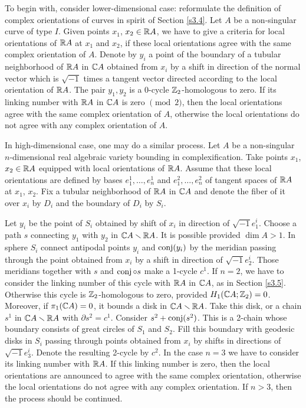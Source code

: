 \documentclass{article}
\numberwithin{equation}{section}
\begin{document}
To begin with, consider lower-dimensional case: reformulate the
definition of complex orientations of curves in spirit of Section
\ref{s3.4}.
Let $A$ be a non-singular curve of type $I$. Given points $x_1$,
$x_2\in\mathbb R A$, we have to give a criteria for local orientations of $\mathbb R
A$ at $x_1$ and $x_2$, if these local orientations agree with the same
complex orientation of $A$. Denote by $y_i$ a point of the boundary of
a tubular neighborhood of $\mathbb R A$ in $\mathbb C A$ obtained from $x_i$ by a
shift in direction of the normal vector which is $\sqrt{-1}$ times a
tangent vector directed according to the local orientation of $\mathbb R A$.
The pair ${y_1, y_2}$ is a 0-cycle $\mathbb Z_2$-homologous to zero. If its
linking number with $\mathbb R A$ in $\mathbb C A$ is zero $\pmod 2$, then the local
orientations agree with the same complex orientation of $A$, otherwise
the local orientations do not agree with any complex orientation of
$A$.

In high-dimensional case, one may do a similar process. Let $A$ be a
non-singular $n$-dimensional real algebraic variety bounding in
complexification. Take points $x_1$, $x_2\in\mathbb R A$ equipped with local
orientations of $\mathbb R A$. Assume that these local orientations are
defined by bases $e_1^1,\dots,e_n^1$ and $e_1^2,\dots,e_n^2$ of tangent
spaces of $\mathbb R A$ at $x_1$, $x_2$. Fix a tubular neighborhood of $\mathbb R A$
in $\mathbb C A$ and denote the fiber of it over $x_i$ by $D_i$ and the
boundary of $D_i$ by $S_i$.

Let $y_i$ be the point of $S_i$ obtained by shift of $x_i$ in direction
of $\sqrt{-1}e_1^i$. Choose a path $s$ connecting $y_1$ with $y_2$ in
$\mathbb C A\smallsetminus\mathbb R A$. It is possible provided $\dim A>1$. In sphere
$S_i$ connect antipodal points $y_i$ and $\operatorname{conj} (y_i)$ by the meridian
passing through the point obtained from $x_i$ by a shift in direction
of $\sqrt{-1}e_2^i$. Those meridians together with $s$ and $\operatorname{conj}\circ
s$ make a 1-cycle $c^1$. If $n=2$, we have to consider the linking
number of this cycle with $\mathbb R A$ in $\mathbb C A$, as in Section \ref{s3.5}.
Otherwise this cycle is $\mathbb Z_2$-homologous to zero, provided $H_1(\mathbb C
A;\mathbb Z_2)=0$. Moreover, if $\pi_1(\mathbb C A)=0$, it bounds a disk in $\mathbb C
A\smallsetminus\mathbb R A$. Take this disk, or a chain $s^1$ in $\mathbb C
A\smallsetminus\mathbb R A$ with $\partial s^2=c^1$. Consider
$s^2+\operatorname{conj}(s^2)$. This is a 2-chain whose boundary consists of great
circles of $S_1$ and $S_2$. Fill this boundary with geodesic disks in
$S_i$ passing through points obtained from $x_i$ by shifts in
directions of $\sqrt{-1}e_3^i$. Denote the resulting 2-cycle by $c^2$.
In the case $n=3$ we have to consider its linking number with $\mathbb R A$.
If this linking number is zero, then the local orientations are
announced to agree with the same complex orientation, otherwise the
local orientations do not agree with any complex orientation. If $n>3$,
then the process should be continued.
\end{document}
